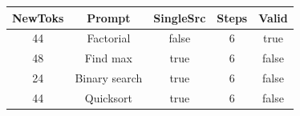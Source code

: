 \begin{table}[h]
\centering
\begin{tabular}{ |c|c|c|c|c| }
\hline
NewToks & Prompt & SingleSrc & Steps & Valid \\
\hline
44 & Factorial & false & 6 & true \\
\hline
48 & Find max & true & 6 & false \\
\hline
24 & Binary search & true & 6 & false \\
\hline
44 & Quicksort & true & 6 & false \\
\hline
\end{tabular}
\end{table}
